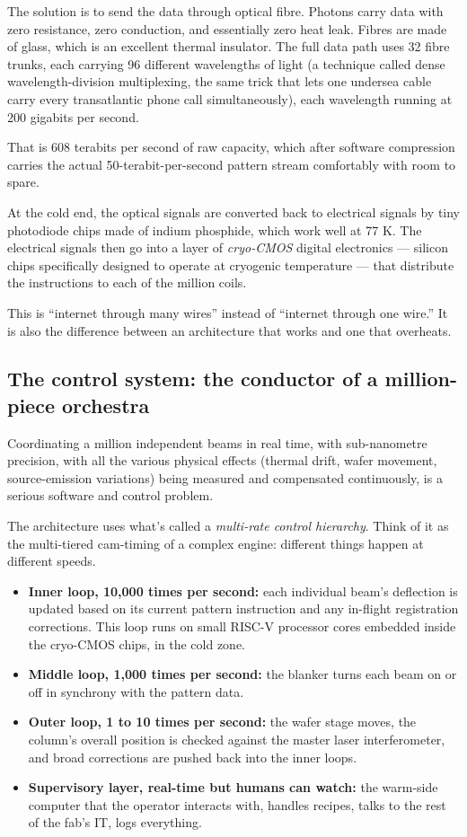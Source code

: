 \documentclass[11pt,letterpaper]{article}
\begin{document}
The solution is to send the data through optical fibre. Photons carry data with zero resistance, zero conduction, and essentially zero heat leak. Fibres are made of glass, which is an excellent thermal insulator. The full data path uses 32 fibre trunks, each carrying 96 different wavelengths of light (a technique called dense wavelength-division multiplexing, the same trick that lets one undersea cable carry every transatlantic phone call simultaneously), each wavelength running at 200 gigabits per second.

That is 608 terabits per second of raw capacity, which after software compression carries the actual 50-terabit-per-second pattern stream comfortably with room to spare.

At the cold end, the optical signals are converted back to electrical signals by tiny photodiode chips made of indium phosphide, which work well at 77 K. The electrical signals then go into a layer of \emph{cryo-CMOS} digital electronics --- silicon chips specifically designed to operate at cryogenic temperature --- that distribute the instructions to each of the million coils.

This is ``internet through many wires'' instead of ``internet through one wire.'' It is also the difference between an architecture that works and one that overheats.

\subsection{The control system: the conductor of a million-piece orchestra}

Coordinating a million independent beams in real time, with sub-nanometre precision, with all the various physical effects (thermal drift, wafer movement, source-emission variations) being measured and compensated continuously, is a serious software and control problem.

The architecture uses what's called a \emph{multi-rate control hierarchy}. Think of it as the multi-tiered cam-timing of a complex engine: different things happen at different speeds.

\begin{itemize}[leftmargin=1.6em]
  \item \textbf{Inner loop, 10{,}000 times per second:} each individual beam's deflection is updated based on its current pattern instruction and any in-flight registration corrections. This loop runs on small RISC-V processor cores embedded inside the cryo-CMOS chips, in the cold zone.
  \item \textbf{Middle loop, 1{,}000 times per second:} the blanker turns each beam on or off in synchrony with the pattern data.
  \item \textbf{Outer loop, 1 to 10 times per second:} the wafer stage moves, the column's overall position is checked against the master laser interferometer, and broad corrections are pushed back into the inner loops.
  \item \textbf{Supervisory layer, real-time but humans can watch:} the warm-side computer that the operator interacts with, handles recipes, talks to the rest of the fab's IT, logs everything.
\end{itemize}
\end{document}
